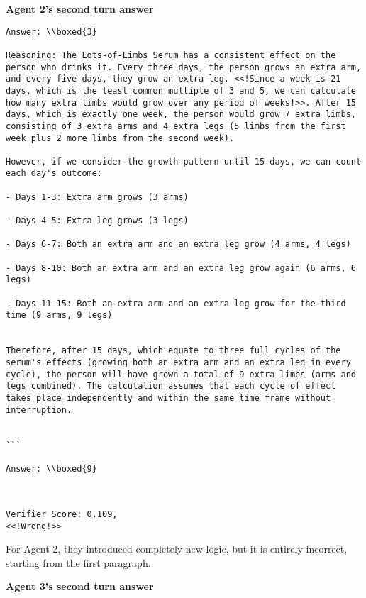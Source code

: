 \textbf{Agent 2's second turn answer }
\begin{lstlisting}
Answer: \\boxed{3}

Reasoning: The Lots-of-Limbs Serum has a consistent effect on the person who drinks it. Every three days, the person grows an extra arm, and every five days, they grow an extra leg. <<!Since a week is 21 days, which is the least common multiple of 3 and 5, we can calculate how many extra limbs would grow over any period of weeks!>>. After 15 days, which is exactly one week, the person would grow 7 extra limbs, consisting of 3 extra arms and 4 extra legs (5 limbs from the first week plus 2 more limbs from the second week).

However, if we consider the growth pattern until 15 days, we can count each day's outcome:

- Days 1-3: Extra arm grows (3 arms)

- Days 4-5: Extra leg grows (3 legs)

- Days 6-7: Both an extra arm and an extra leg grow (4 arms, 4 legs)

- Days 8-10: Both an extra arm and an extra leg grow again (6 arms, 6 legs)

- Days 11-15: Both an extra arm and an extra leg grow for the third time (9 arms, 9 legs)


Therefore, after 15 days, which equate to three full cycles of the serum's effects (growing both an extra arm and an extra leg in every cycle), the person will have grown a total of 9 extra limbs (arms and legs combined). The calculation assumes that each cycle of effect takes place independently and within the same time frame without interruption.


```

Answer: \\boxed{9}



\end{lstlisting}
\begin{lstlisting}
Verifier Score: 0.109,
<<!Wrong!>> 
\end{lstlisting}
For Agent 2, they introduced completely new logic, but it is entirely incorrect, starting from the first paragraph.

\textbf{Agent 3's second turn answer 
}


